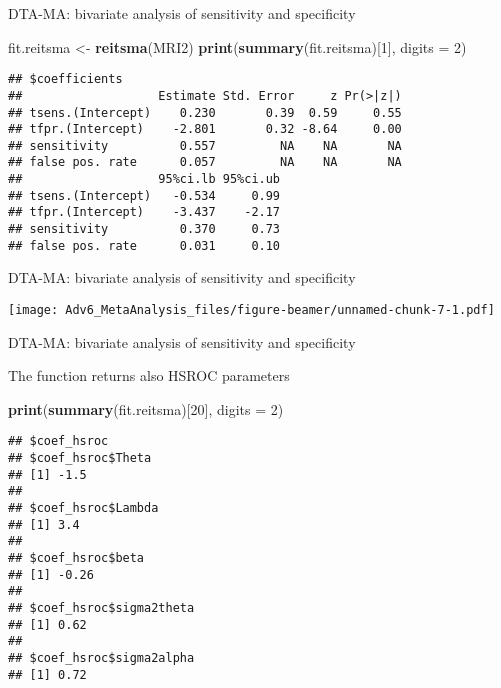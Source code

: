 \documentclass[
  ignorenonframetext,
  aspectratio=43,
]{beamer}
\newenvironment{Shaded}{\begin{snugshade}}{\end{snugshade}}
\newcommand{\DataTypeTok}[1]{\textcolor[rgb]{0.13,0.29,0.53}{#1}}
\newcommand{\DecValTok}[1]{\textcolor[rgb]{0.00,0.00,0.81}{#1}}
\newcommand{\KeywordTok}[1]{\textcolor[rgb]{0.13,0.29,0.53}{\textbf{#1}}}
\newcommand{\NormalTok}[1]{#1}
\newcommand{\StringTok}[1]{\textcolor[rgb]{0.31,0.60,0.02}{#1}}
\begin{document}
\begin{frame}[fragile]{DTA-MA: bivariate analysis of sensitivity and
specificity}
\protect\hypertarget{dta-ma-bivariate-analysis-of-sensitivity-and-specificity}{}

\begin{Shaded}
\begin{Highlighting}[]
\NormalTok{fit.reitsma <-}\StringTok{ }\KeywordTok{reitsma}\NormalTok{(MRI2)}
\KeywordTok{print}\NormalTok{(}\KeywordTok{summary}\NormalTok{(fit.reitsma)[}\DecValTok{1}\NormalTok{], }\DataTypeTok{digits =} \DecValTok{2}\NormalTok{)}
\end{Highlighting}
\end{Shaded}

\begin{verbatim}
## $coefficients
##                   Estimate Std. Error     z Pr(>|z|)
## tsens.(Intercept)    0.230       0.39  0.59     0.55
## tfpr.(Intercept)    -2.801       0.32 -8.64     0.00
## sensitivity          0.557         NA    NA       NA
## false pos. rate      0.057         NA    NA       NA
##                   95%ci.lb 95%ci.ub
## tsens.(Intercept)   -0.534     0.99
## tfpr.(Intercept)    -3.437    -2.17
## sensitivity          0.370     0.73
## false pos. rate      0.031     0.10
\end{verbatim}

\end{frame}

\begin{frame}{DTA-MA: bivariate analysis of sensitivity and specificity}
\protect\hypertarget{dta-ma-bivariate-analysis-of-sensitivity-and-specificity-1}{}

\texttt{[image: Adv6\_MetaAnalysis\_files/figure-beamer/unnamed-chunk-7-1.pdf]}

\end{frame}

\begin{frame}[fragile]{DTA-MA: bivariate analysis of sensitivity and
specificity}
\protect\hypertarget{dta-ma-bivariate-analysis-of-sensitivity-and-specificity-2}{}

The function returns also HSROC parameters

\begin{Shaded}
\begin{Highlighting}[]
\KeywordTok{print}\NormalTok{(}\KeywordTok{summary}\NormalTok{(fit.reitsma)[}\DecValTok{20}\NormalTok{], }\DataTypeTok{digits =} \DecValTok{2}\NormalTok{)}
\end{Highlighting}
\end{Shaded}

\begin{verbatim}
## $coef_hsroc
## $coef_hsroc$Theta
## [1] -1.5
## 
## $coef_hsroc$Lambda
## [1] 3.4
## 
## $coef_hsroc$beta
## [1] -0.26
## 
## $coef_hsroc$sigma2theta
## [1] 0.62
## 
## $coef_hsroc$sigma2alpha
## [1] 0.72
\end{verbatim}

\end{frame}
\end{document}
